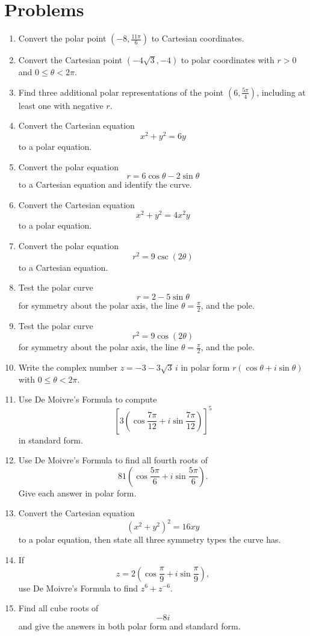 \documentclass[12pt]{article}
\begin{document}
\section*{Problems}
\begin{enumerate}[leftmargin=*, itemsep=1em, topsep=0.8em]
  \item Convert the polar point $\left(-8,\frac{11\pi}{6}\right)$ to Cartesian coordinates.

  \item Convert the Cartesian point $(-4\sqrt{3},-4)$ to polar coordinates with $r>0$ and $0\le \theta<2\pi$.

  \item Find three additional polar representations of the point $\left(6,\frac{5\pi}{4}\right)$, including at least one with negative $r$.

  \item Convert the Cartesian equation
  \[
  x^2+y^2=6y
  \]
  to a polar equation.

  \item Convert the polar equation
  \[
  r=6\cos\theta-2\sin\theta
  \]
  to a Cartesian equation and identify the curve.

  \item Convert the Cartesian equation
  \[
  x^2+y^2=4x^2y
  \]
  to a polar equation.

  \item Convert the polar equation
  \[
  r^2=9\csc(2\theta)
  \]
  to a Cartesian equation.

  \item Test the polar curve
  \[
  r=2-5\sin\theta
  \]
  for symmetry about the polar axis, the line $\theta=\frac{\pi}{2}$, and the pole.

  \item Test the polar curve
  \[
  r^2=9\cos(2\theta)
  \]
  for symmetry about the polar axis, the line $\theta=\frac{\pi}{2}$, and the pole.

  \item Write the complex number $z=-3-3\sqrt{3}\,i$ in polar form $r(\cos\theta+i\sin\theta)$ with $0\le \theta<2\pi$.

  \item Use De Moivre's Formula to compute
  \[
  \left[3\left(\cos\frac{7\pi}{12}+i\sin\frac{7\pi}{12}\right)\right]^5
  \]
  in standard form.

  \item Use De Moivre's Formula to find all fourth roots of
  \[
  81\left(\cos\frac{5\pi}{6}+i\sin\frac{5\pi}{6}\right).
  \]
  Give each answer in polar form.

  \item Convert the Cartesian equation
  \[
  (x^2+y^2)^2=16xy
  \]
  to a polar equation, then state all three symmetry types the curve has.

  \item If
  \[
  z=2\left(\cos\frac{\pi}{9}+i\sin\frac{\pi}{9}\right),
  \]
  use De Moivre's Formula to find $z^6+z^{-6}$.

  \item Find all cube roots of
  \[
  -8i
  \]
  and give the answers in both polar form and standard form.
\end{enumerate}
\end{document}
